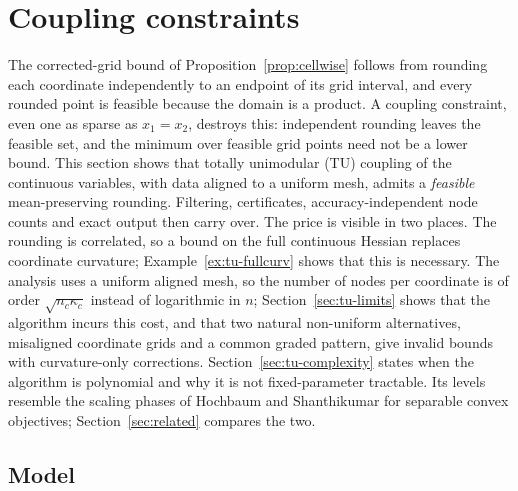 \section{Coupling constraints}\label{sec:constraints}

The corrected-grid bound of Proposition~\ref{prop:cellwise} follows from
rounding each coordinate independently to an endpoint of its grid interval,
and every rounded point is feasible because the domain is a product. A coupling constraint, even one as sparse as $x_1=x_2$, destroys
this: independent rounding leaves the feasible set, and the minimum over
feasible grid points need not be a lower bound. This section shows that
totally unimodular (TU) coupling of the continuous variables, with data
aligned to a uniform mesh, admits a \emph{feasible} mean-preserving rounding.
Filtering, certificates, accuracy-independent node counts and exact output
then carry over. The price is visible in two places. The rounding is
correlated, so a bound on the full continuous Hessian replaces coordinate
curvature; Example~\ref{ex:tu-fullcurv} shows that this is necessary. The
analysis uses a uniform aligned mesh, so the number of nodes per coordinate
is of order $\sqrt{n_c\kappa_c}$ instead of logarithmic in $n$;
Section~\ref{sec:tu-limits} shows that the algorithm incurs this cost, and
that two natural non-uniform alternatives, misaligned coordinate grids and a
common graded pattern, give invalid bounds with curvature-only corrections.
Section~\ref{sec:tu-complexity} states when the algorithm is polynomial and
why it is not fixed-parameter tractable. Its levels resemble the scaling
phases of Hochbaum and Shanthikumar \cite{HochbaumShanthikumar1990} for
separable convex objectives; Section~\ref{sec:related} compares the two.

\subsection{Model}\label{sec:tu-model}

